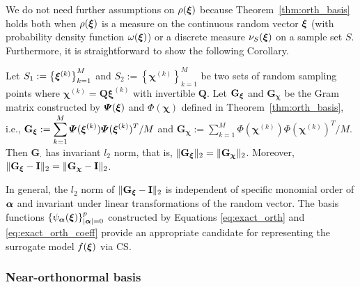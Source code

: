 We do not need further assumptions on $\rho(\bm\xi)$ because Theorem~\ref{thm:orth_basis} holds both when $\rho(\bm\xi)$  is a measure on the continuous random vector $\bm\xi$ (with probability density function $\omega(\bm\xi)$) or a discrete measure $\nu_S(\bm\xi)$ on a sample set $S$.
Furthermore, it is straightforward to show the following Corollary.
\begin{cor}
  Let $S_1 := \left\{\bm\xi^{(k)}\right\}_{k = 1}^{M}$ and $S_2 := \left\{\bm\chi^{(k)}\right\}_{k = 1}^{M}$ be two sets of random sampling points where $\bm\chi^{(k)} = \mathbf{Q}\bm\xi^{(k)}$ with invertible $\mathbf{Q}$.
  Let $\mathbf{G}_{\bm\xi}$ and $\mathbf{G}_{\bm\chi}$ be the Gram matrix constructed by $\bm{\varPsi}(\bm\xi)$ and $\bm{\varPhi}(\bm\chi)$ defined in Theorem~\ref{thm:orth_basis}, i.e.,
    $\displaystyle \mathbf{G}_{\bm\xi} := \sum_{k=1}^{M} \bm{\varPsi}(\bm\xi^{(k)}) \bm{\varPsi}(\bm\xi^{(k)})^T / M$ and $\displaystyle \mathbf{G}_{\bm\chi} := \sum_{k=1}^{M} \bm{\varPhi}(\bm\chi^{(k)}) \bm{\varPhi}(\bm\chi^{(k)})^T / M$.
  Then $\mathbf{G}_{\cdot}$ has invariant $l_2$ norm, that is, $\Vert \mathbf{G}_{\bm\xi}\Vert_2 = \Vert \mathbf{G}_{\bm\chi}\Vert_2$. \label{col:orth_basis}
  Moreover, $\Vert \mathbf{G}_{\bm\xi}-\mathbf{I}\Vert_2 = \Vert \mathbf{G}_{\bm\chi}-\mathbf{I}\Vert_2$.
\end{cor}

In general, the $l_2$ norm of $\Vert \mathbf{G}_{\bm\xi}-\mathbf{I}\Vert_2$ is independent of specific monomial order of $\bm\alpha$ and invariant under linear transformations of the random vector.
The basis functions $\left\{\psi_{\bm\alpha}(\bm\xi)\right\}_{\vert \bm\alpha \vert = 0}^{p}$ constructed by Equations \eqref{eq:exact_orth} and \eqref{eq:exact_orth_coeff} provide an appropriate candidate for representing the surrogate model $f(\bm\xi)$ via \ac{CS}.

\subsubsection{Near-orthonormal basis}

